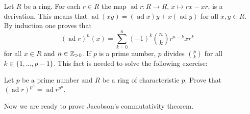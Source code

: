 Let $R$ be a ring. For each $r\in R$ the map $\operatorname{ad}{r}\colon
R\to R$, $x\mapsto rx-xr$, is a derivation. This means that
$\operatorname{ad}(xy)=(\operatorname{ad} x)y+x(\operatorname{ad} y)$ for all $x,y\in R$. 
By induction one proves that 
\begin{equation}
	\label{eq:Leibniz}
	(\operatorname{ad}{r})^n(x)=\sum_{k=0}^n(-1)^k\binom{n}{k}r^{n-k}xr^k
\end{equation}
for all $x\in R$ and $n\in\mathbb{Z}_{>0}$. If $p$ 
is a prime number, 
$p$ divides $\binom{p}{k}$ for all $k\in\{1,\dots,p-1\}$. This fact
is needed to solve the following exercise:

\begin{exercise}
    Let $p$ be a prime number and $R$ be a ring of characteristic $p$. 
    Prove that $(\operatorname{ad}{r})^{p^n}=\operatorname{ad}{r^{p^n}}$. 
\end{exercise}



Now we are ready to prove Jacobson's commutativity theorem. 

